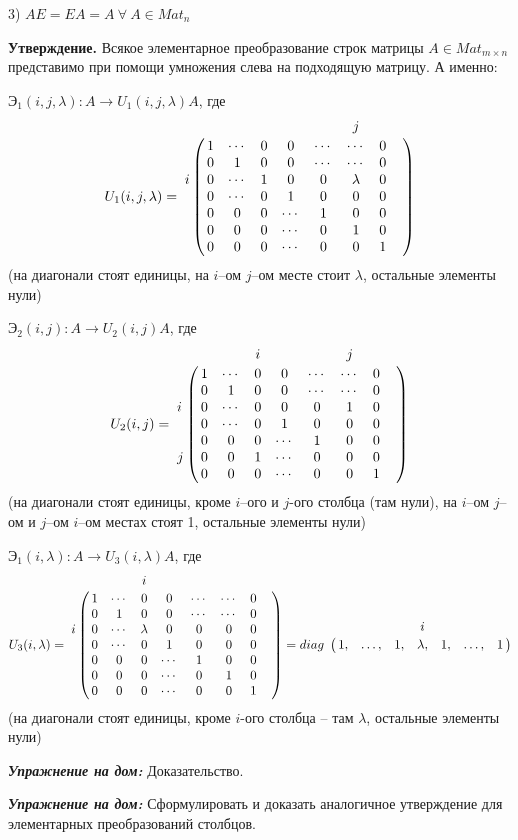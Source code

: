 3) $AE = EA = A \ \forall \ A \in Mat_n$

\vspace{\baselineskip}
\textbf{Утверждение.} Всякое элементарное преобразование строк матрицы $A \in Mat_{m \times n}$ представимо при помощи умножения слева на подходящую матрицу. А именно:

$Э_1(i, j, \lambda): A \rightarrow U_1(i, j, \lambda) A$, где
\[ U_1(i, j, \lambda) = \bordermatrix{ 
    	 & & & & & & j & &  \cr
    	 & 1 & \cdots & 0 & 0 & \cdots & \cdots & 0 \cr 
          & 0 & 1 & 0 & 0 & \cdots & \cdots & 0 \cr
		i & 0 & \cdots & 1 & 0 & 0 & \lambda & 0  \cr
         & 0 & \cdots & 0 & 1 & 0 & 0 & 0  \cr
        & 0 & 0 & 0 & \cdots & 1 & 0 & 0  \cr
        & 0 & 0 & 0 & \cdots & 0 & 1 & 0  \cr
        & 0 & 0 & 0 & \cdots & 0 & 0 & 1 }
\]
(на диагонали стоят единицы, на $i$--ом $j$--ом месте стоит $\lambda$, остальные элементы нули)

\vspace{\baselineskip}
$Э_2(i, j): A \rightarrow U_2(i, j) A$, где
\[ U_2(i, j) = \bordermatrix{ 
    	 & & & i & & & j & &  \cr
    	 & 1 & \cdots & 0 & 0 & \cdots & \cdots & 0 \cr 
          & 0 & 1 & 0 & 0 & \cdots & \cdots & 0 \cr
		i & 0 & \cdots & 0 & 0 & 0 & 1 & 0  \cr
         & 0 & \cdots & 0 & 1 & 0 & 0 & 0  \cr
        & 0 & 0 & 0 & \cdots & 1 & 0 & 0  \cr
        j & 0 & 0 & 1 & \cdots & 0 & 0 & 0  \cr
        & 0 & 0 & 0 & \cdots & 0 & 0 & 1 }
\]
(на диагонали стоят единицы, кроме $i$--ого и $j$-ого столбца (там нули), на $i$--ом $j$--ом и $j$--ом $i$--ом местах стоят 1, остальные элементы нули)

\vspace{\baselineskip}
$Э_1(i, \lambda): A \rightarrow U_3(i, \lambda) A$, где
\[ U_3(i,\lambda) = \bordermatrix{ 
    	 & & & i & & & & &  \cr
    	 & 1 & \cdots & 0 & 0 & \cdots & \cdots & 0 \cr 
          & 0 & 1 & 0 & 0 & \cdots & \cdots & 0 \cr
		i & 0 & \cdots & \lambda & 0 & 0 & 0 & 0  \cr
         & 0 & \cdots & 0 & 1 & 0 & 0 & 0  \cr
        & 0 & 0 & 0 & \cdots & 1 & 0 & 0  \cr
        & 0 & 0 & 0 & \cdots & 0 & 1 & 0  \cr
        & 0 & 0 & 0 & \cdots & 0 & 0 & 1 } = diag 
        \bordermatrix{
        & & & & i & & \cr
        & 1, & \dots, & 1, & \lambda, & 1, & \dots, & 1}
\]
(на диагонали стоят единицы, кроме $i$-ого столбца -- там $\lambda$, остальные элементы нули)

\vspace{\baselineskip}
\textbf{\textit{Упражнение на дом:}} Доказательство.

\textbf{\textit{Упражнение на дом:}} Сформулировать и доказать аналогичное утверждение для элементарных преобразований столбцов.


